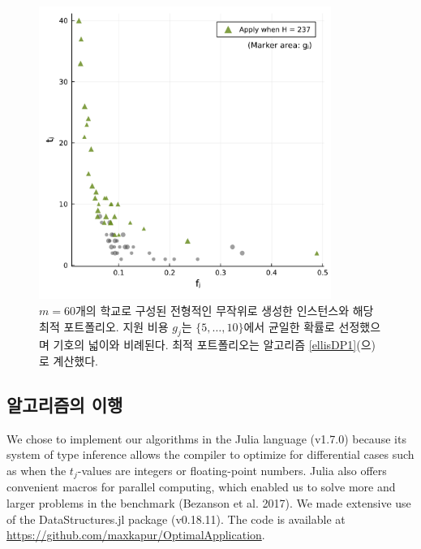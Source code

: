 \documentclass[11pt]{article} %
\newif\ifen
\theoremstyle{definition}
\theoremstyle{definition}
\begin{document}
\begin{figure}[h!] 
\centering
\includegraphics[width=0.85\textwidth]{./plots/samplemarket.pdf}
  \caption{\label{samplemarket}
 \ifen A typical randomly-generated instance with $m=60$ schools and its optimal application portfolio. The application costs $g_j$ were drawn uniformly from $\{5, \dots, 10\}$. The optimal portfolio was computed using Algorithm \ref{ellisDP1}.
 \else $m=60$개의 학교로 구성된 전형적인 무작위로 생성한 인스턴스와 해당 최적 포트폴리오. 지원 비용 $g_j$는 $\{5, \dots, 10\}$에서 균일한 확률로 선정했으며 기호의 넓이와 비례된다. 최적 포트폴리오는 알고리즘 \ref{ellisDP1}(으)로 계산했다. \fi}
\end{figure}




\ifen \subsection{Implementation notes} \else \subsection{알고리즘의 이행}\fi
We chose to implement our algorithms in the Julia language (v1.7.0) because its system of type inference allows the compiler to optimize for differential cases such as when the $t_j$-values are integers or floating-point numbers. Julia also offers convenient macros for parallel computing, which enabled us to solve more and larger problems in the benchmark (Bezanson et al. 2017). We made extensive use of the DataStructures.jl package (v0.18.11). The code is available at \url{https://github.com/maxkapur/OptimalApplication}.
\end{document}
